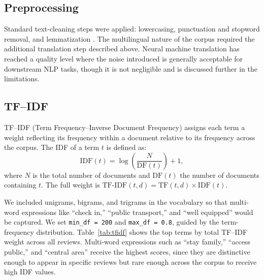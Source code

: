 \documentclass[11pt]{article}
\begin{document}
\subsection{Preprocessing}
\label{sec:preproc}
Standard text-cleaning steps were applied: lowercasing, punctuation and stopword removal, and lemmatization \citep{manning2008introduction}. The multilingual nature of the corpus required the additional translation step described above. Neural machine translation has reached a quality level where the noise introduced is generally acceptable for downstream NLP tasks, though it is not negligible and is discussed further in the limitations.

\subsection{TF--IDF}
TF--IDF (Term Frequency--Inverse Document Frequency) \citep{sparckjones1972statistical, ramos2003using} assigns each term a weight reflecting its frequency within a document relative to its frequency across the corpus. The IDF of a term $t$ is defined as:
\[
\mathrm{IDF}(t) = \log\!\left(\frac{N}{\mathrm{DF}(t)}\right) + 1,
\]
where $N$ is the total number of documents and $\mathrm{DF}(t)$ the number of documents containing $t$. The full weight is $\mathrm{TF\text{-}IDF}(t,d) = \mathrm{TF}(t,d) \times \mathrm{IDF}(t)$.

We included unigrams, bigrams, and trigrams in the vocabulary so that multi-word expressions like ``check in,'' ``public transport,'' and ``well equipped'' would be captured. We set \texttt{min\_df\,=\,200} and \texttt{max\_df\,=\,0.8}, guided by the term-frequency distribution. Table~\ref{tab:tfidf} shows the top terms by total TF--IDF weight across all reviews. Multi-word expressions such as ``stay family,'' ``access public,'' and ``central area'' receive the highest scores, since they are distinctive enough to appear in specific reviews but rare enough across the corpus to receive high IDF values.
\end{document}
